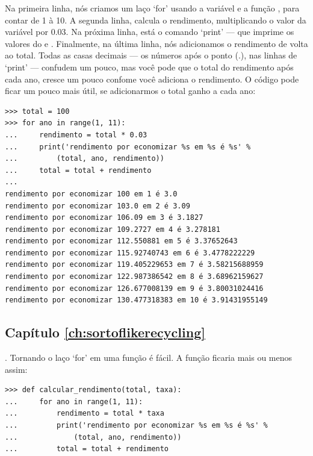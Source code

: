 Na primeira linha, nós criamos um laço `for' usando a variável  e a função , para contar de 1 à 10. A segunda linha, calcula o rendimento, multiplicando o valor da variável  por 0.03. Na próxima linha, está o comando `print' --- que imprime os valores do  e . Finalmente, na última linha, nós adicionamos o rendimento de volta ao total.
Todas as casas decimais --- os números após o ponto (.), nas linhas de `print' --- confudem um pouco, mas você pode que o total do rendimento após cada ano, cresce um pouco confome você adiciona o rendimento.
O código pode ficar um pouco mais útil, se adicionarmos o total ganho a cada ano:

\begin{listing}
\begin{verbatim}
>>> total = 100
>>> for ano in range(1, 11):
...     rendimento = total * 0.03
...     print('rendimento por economizar %s em %s é %s' % 
...         (total, ano, rendimento))
...     total = total + rendimento
... 
rendimento por economizar 100 em 1 é 3.0
rendimento por economizar 103.0 em 2 é 3.09
rendimento por economizar 106.09 em 3 é 3.1827
rendimento por economizar 109.2727 em 4 é 3.278181
rendimento por economizar 112.550881 em 5 é 3.37652643
rendimento por economizar 115.92740743 em 6 é 3.4778222229
rendimento por economizar 119.405229653 em 7 é 3.58215688959
rendimento por economizar 122.987386542 em 8 é 3.68962159627
rendimento por economizar 126.677008139 em 9 é 3.80031024416
rendimento por economizar 130.477318383 em 10 é 3.91431955149
\end{verbatim}
\end{listing}

\subsection*{Capítulo \ref{ch:sortoflikerecycling}}

. Tornando o laço `for' em uma função é fácil. A função ficaria mais ou menos assim:

\begin{listing}
\begin{verbatim}
>>> def calcular_rendimento(total, taxa):
...     for ano in range(1, 11):
...         rendimento = total * taxa
...         print('rendimento por economizar %s em %s é %s' % 
...             (total, ano, rendimento))
...         total = total + rendimento
\end{verbatim}
\end{listing}

